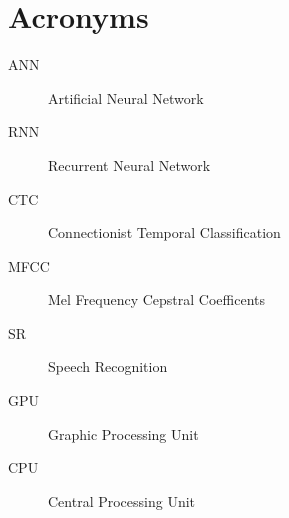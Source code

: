 \chapter{Acronyms}
\begin{description}
	\item[ANN] Artificial Neural Network
	\item[RNN] Recurrent Neural Network
	\item[CTC] Connectionist Temporal Classification
	\item[MFCC] Mel Frequency Cepstral Coefficents
	\item[SR] Speech Recognition
	\item[GPU] Graphic Processing Unit
	\item[CPU] Central Processing Unit
\end{description}
